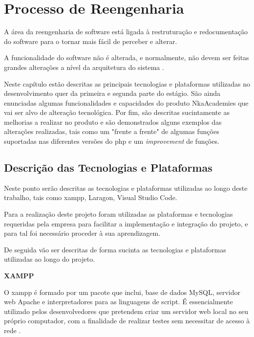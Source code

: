 
\chapter{Processo de Reengenharia}
\label{migracao}

A área da reengenharia de software está ligada à restruturação e redocumentação do software para o tornar mais fácil de perceber e alterar.

A funcionalidade do software não é alterada, e normalmente, não devem ser feitas grandes alterações a nível da arquitetura do sistema \citep{somerville}.

Neste capítulo estão descritas as principais tecnologias e plataformas utilizadas no desenvolvimento quer da primeira e segunda parte do estágio. São ainda enunciadas algumas funcionalidades e capacidades do produto NkaAcademies que vai ser alvo de alteração tecnológica. Por fim, são descritas sucintamente as melhorias a realizar no produto e são demonstrados alguns exemplos das alterações realizadas, tais como um "frente a frente"  de algumas funções suportadas nas diferentes versões do \acrshort{php} e um \textit{improvement} de funções.


\section{Descrição das Tecnologias e Plataformas}
\label{tecnologias}
Neste ponto serão descritas as tecnologias e plataformas utilizadas ao longo deste trabalho, tais como \acrshort{xampp}, Laragon, Visual Studio Code.

Para a realização deste projeto foram utilizadas as plataformas e tecnologias requeridas pela empresa para facilitar a implementação e integração do projeto, e para tal foi necessário proceder à sua aprendizagem.

De seguida vão ser descritas de forma sucinta as tecnologias e plataformas utilizadas ao longo do projeto.\newline


\textbf{XAMPP}

O \acrshort{xampp} é formado por um pacote que inclui, base de dados MySQL, servidor web Apache e interpretadores para as linguagens de script. É essencialmente utilizado pelos desenvolvedores que pretendem criar um servidor web local no seu próprio computador, com a finalidade de realizar testes sem necessitar de acesso à rede \citep{xampp}.\newline


